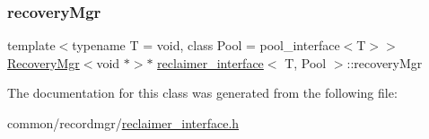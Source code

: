 \subsubsection{\texorpdfstring{recovery\+Mgr}{recoveryMgr}}
{\footnotesize\ttfamily template$<$typename T  = void, class Pool  = pool\+\_\+interface$<$\+T$>$$>$ \\
\hyperlink{classRecoveryMgr}{Recovery\+Mgr}$<$void $\ast$$>$$\ast$ \hyperlink{classreclaimer__interface}{reclaimer\+\_\+interface}$<$ T, Pool $>$\+::recovery\+Mgr}



The documentation for this class was generated from the following file\+:\begin{DoxyCompactItemize}
\item 
common/recordmgr/\hyperlink{reclaimer__interface_8h}{reclaimer\+\_\+interface.\+h}\end{DoxyCompactItemize}
